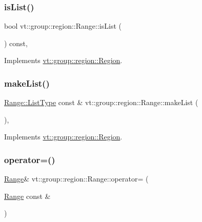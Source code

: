 \subsubsection{\texorpdfstring{is\+List()}{isList()}}
{\footnotesize\ttfamily bool vt\+::group\+::region\+::\+Range\+::is\+List (\begin{DoxyParamCaption}{ }\end{DoxyParamCaption}) const\hspace{0.3cm}{\ttfamily [override]}, {\ttfamily [virtual]}}



Implements \hyperlink{structvt_1_1group_1_1region_1_1_region_a5c05e6ebee5a6d7e77d9ebf33c9ff50c}{vt\+::group\+::region\+::\+Region}.

\mbox{\label{structvt_1_1group_1_1region_1_1_range_abd64b2d424a89ab0f603be15957d0fd4}} 
\subsubsection{\texorpdfstring{make\+List()}{makeList()}}
{\footnotesize\ttfamily \hyperlink{structvt_1_1group_1_1region_1_1_region_a4e35b2fc6dca06aca0b7bc0e19b35c5a}{Range\+::\+List\+Type} const  \& vt\+::group\+::region\+::\+Range\+::make\+List (\begin{DoxyParamCaption}{ }\end{DoxyParamCaption})\hspace{0.3cm}{\ttfamily [override]}, {\ttfamily [virtual]}}



Implements \hyperlink{structvt_1_1group_1_1region_1_1_region_ac85c027b3c402c712c888aefc198c6be}{vt\+::group\+::region\+::\+Region}.

\mbox{\label{structvt_1_1group_1_1region_1_1_range_a7a1ee1554643ce6074d24dc129cef8a1}} 
\subsubsection{\texorpdfstring{operator=()}{operator=()}}
{\footnotesize\ttfamily \hyperlink{structvt_1_1group_1_1region_1_1_range}{Range}\& vt\+::group\+::region\+::\+Range\+::operator= (\begin{DoxyParamCaption}\item[{\hyperlink{structvt_1_1group_1_1region_1_1_range}{Range} const \&}]{ }\end{DoxyParamCaption})\hspace{0.3cm}{\ttfamily [delete]}}

